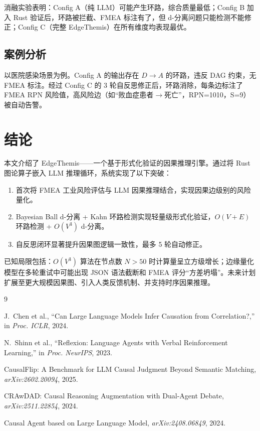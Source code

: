 \documentclass[12pt, a4paper]{ctexart}
\begin{document}
消融实验表明：Config A（纯 LLM）可能产生环路，综合质量最低；Config B 加入 Rust 验证后，环路被拦截、FMEA 标注有了，但 d-分离问题只能检测不能修正；Config C（完整 EdgeThemis）在所有维度均表现最优。

\subsection{案例分析}

以医院感染场景为例。Config A 的输出存在 $D \to A$ 的环路，违反 DAG 约束，无 FMEA 标注。经过 Config C 的 3 轮自反思修正后，环路消除，每条边标注了 FMEA RPN 风险值，高风险边（如``败血症患者$\to$死亡''，RPN=1010，S=9）被自动告警。

\section{结论}

本文介绍了 EdgeThemis——一个基于形式化验证的因果推理引擎。通过将 Rust 图论算子嵌入 LLM 推理循环，系统实现了以下突破：

\begin{enumerate}
  \item 首次将 FMEA 工业风险评估与 LLM 因果推理结合，实现因果边级别的风险量化。
  \item Bayesian Ball d-分离 + Kahn 环路检测实现轻量级形式化验证，$O(V+E)$ 环路检测 + $O(V^3)$ d-分离。
  \item 自反思闭环显著提升因果图逻辑一致性，最多 5 轮自动修正。
\end{enumerate}

已知局限包括：$O(V^3)$ 算法在节点数 $N>50$ 时计算量呈立方级增长；边缘量化模型在多轮重试中可能出现 JSON 语法截断和 FMEA 评分``方差坍塌''。未来计划扩展至更大规模因果图、引入人类反馈机制、并支持时序因果推理。

\newpage
\begin{thebibliography}{9}

J.~Chen et al., ``Can Large Language Models Infer Causation from Correlation?,'' in \textit{Proc. ICLR}, 2024.

N.~Shinn et al., ``Reflexion: Language Agents with Verbal Reinforcement Learning,'' in \textit{Proc. NeurIPS}, 2023.

CausalFlip: A Benchmark for LLM Causal Judgment Beyond Semantic Matching, \textit{arXiv:2602.20094}, 2025.

CRAwDAD: Causal Reasoning Augmentation with Dual-Agent Debate, \textit{arXiv:2511.22854}, 2024.

Causal Agent based on Large Language Model, \textit{arXiv:2408.06849}, 2024.

\end{thebibliography}
\end{document}
